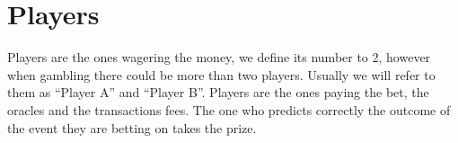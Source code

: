 \section{Players}

Players are the ones wagering the money, we define its number to 2, however
  when gambling there could be more than two players. Usually we will refer to
  them as ``Player A'' and ``Player B''. Players are the ones paying the bet,
  the oracles and the transactions fees. The one who predicts correctly the
  outcome of the event they are betting on takes the prize.
